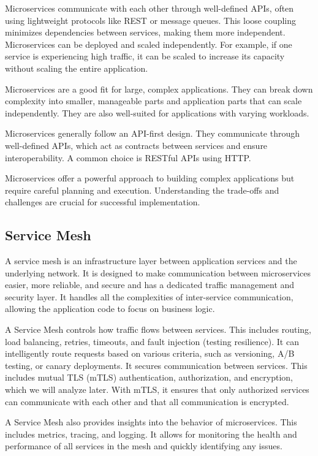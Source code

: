 Microservices communicate with each other through well-defined APIs,
often using lightweight protocols like REST or message queues. This
loose coupling minimizes dependencies between services, making them more
independent. Microservices can be deployed and scaled independently. For
example, if one service is experiencing high traffic, it can be scaled
to increase its capacity without scaling the entire application.

Microservices are a good fit for large, complex applications. They can
break down complexity into smaller, manageable parts and application
parts that can scale independently. They are also well-suited for
applications with varying workloads.

Microservices generally follow an API-first design. They communicate
through well-defined APIs, which act as contracts between services and
ensure interoperability. A common choice is RESTful APIs using HTTP.

Microservices offer a powerful approach to building complex applications
but require careful planning and execution. Understanding the trade-offs
and challenges are crucial for successful implementation.

\subsection{Service Mesh}

A service mesh is an infrastructure layer between application services
and the underlying network. It is designed to make communication between
microservices easier, more reliable, and secure and has a dedicated
traffic management and security layer. It handles all the complexities
of inter-service communication, allowing the application code to focus
on business logic.

A Service Mesh controls how traffic flows between services. This
includes routing, load balancing, retries, timeouts, and fault injection
(testing resilience). It can intelligently route requests based on
various criteria, such as versioning, A/B testing, or canary
deployments. It secures communication between services. This includes
mutual TLS (mTLS) authentication, authorization, and encryption, which
we will analyze later. With mTLS, it ensures that only authorized
services can communicate with each other and that all communication is
encrypted.

A Service Mesh also provides insights into the behavior of
microservices. This includes metrics, tracing, and logging. It allows
for monitoring the health and performance of all services in the mesh
and quickly identifying any issues.

